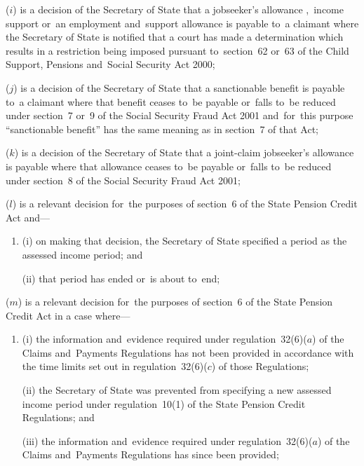 \documentclass[12pt,a4paper]{article}
\begin{document}
\begin{enumerate}
($i$) is a decision of the Secretary of State that a jobseeker’s allowance%
,~income support or~an employment and~support allowance  %
is payable to~a claimant where the Secretary of State is notified that a court has made a determination which results in a restriction being imposed pursuant to~section~62 or~63 of the Child Support, Pensions and~Social Security Act 2000;

($j$) is a decision of the Secretary of State that a sanctionable benefit is payable to~a claimant where that benefit ceases to~be payable or~falls to~be reduced under section~7 or~9 of the Social Security Fraud Act 2001 and~for~this purpose “sanctionable benefit” has the same meaning as in section~7 of that Act;

($k$) is a decision of the Secretary of State that a joint-claim jobseeker’s allowance is payable where that allowance ceases to~be payable or~falls to~be reduced under section~8 of the Social Security Fraud Act 2001;

($l$) is a relevant decision for~the purposes of section~6 of the State Pension Credit Act and—
\begin{enumerate}\item[]
(i) on making that decision, the Secretary of State specified a period as the assessed income period; and

(ii) that period has ended or~is about to~end;
\end{enumerate}

($m$) is a relevant decision for~the purposes of section~6 of the State Pension Credit Act in a case where—
\begin{enumerate}\item[]
(i) the information and~evidence required under regulation~32(6)($a$)  of the Claims and~Payments Regulations has not been provided in accordance with the time limits set out in regulation~32(6)($c$)  of those Regulations;

(ii) the Secretary of State was prevented from specifying a new assessed income period under regulation~10(1) of the State Pension Credit Regulations; and

\begin{sloppypar}
(iii) the information and~evidence required under regulation~32(6)($a$)  of the Claims and~Payments Regulations has since been provided;
\end{sloppypar}
\end{enumerate}


\end{enumerate}
\end{document}
